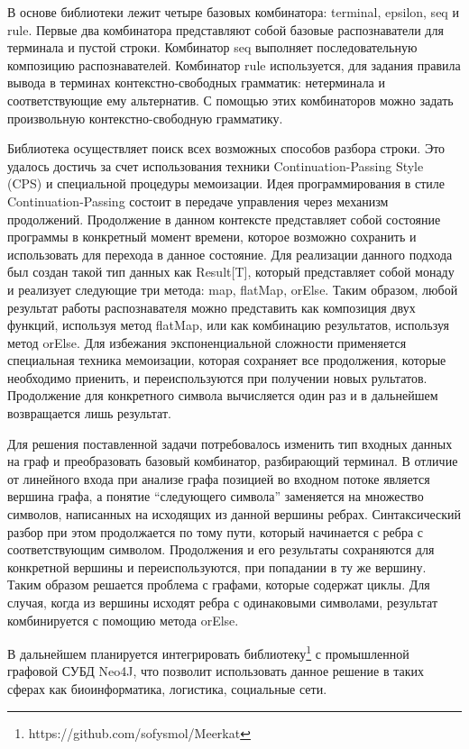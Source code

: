\documentclass [a4paper] {article}
\begin{document}
В основе библиотеки лежит четыре базовых комбинатора: terminal, epsilon, seq и rule. Первые два комбинатора представляют собой базовые распознаватели для терминала и пустой строки. Комбинатор seq выполняет последовательную композицию распознавателей. Комбинатор rule используется, для задания правила вывода в терминах контекстно-свободных грамматик: нетерминала и соответствующие ему альтернатив. С помощью этих комбинаторов можно задать произвольную контекстно-свободную грамматику. 


Библиотека осуществляет поиск всех возможных способов разбора строки. Это удалось достичь за счет использования техники Continuation-Passing Style (CPS) и специальной процедуры мемоизации. Идея программирования в стиле Continuation-Passing состоит в передаче управления через механизм продолжений. Продолжение в данном контексте представляет собой состояние программы в конкретный момент времени, которое возможно сохранить и использовать для перехода в данное состояние. Для реализации данного подхода был создан такой тип данных как Result[T],  который представляет собой монаду и реализует следующие три метода: map, flatMap, orElse. Таким образом, любой результат работы распознавателя можно представить как композиция двух функций, используя метод flatMap, или как комбинацию результатов, используя метод orElse. Для избежания экспоненциальной сложности применяется специальная техника мемоизации, которая сохраняет все продолжения, которые необходимо приенить, и переиспользуются при получении новых рультатов. Продолжение для конкретного символа вычисляется один раз и в дальнейшем возвращается лишь результат. 


Для решения поставленной задачи потребовалось изменить тип входных данных на граф и преобразовать базовый комбинатор, разбирающий терминал. В отличие от линейного входа при анализе графа позицией во входном потоке является вершина графа, а понятие “следующего символа” заменяется на множество символов, написанных на исходящих из данной вершины ребрах. Синтаксический разбор при этом продолжается по тому пути, который начинается с ребра с соответствующим символом. Продолжения и его результаты сохраняются для конкретной вершины и переиспользуются, при попадании в ту же вершину. Таким образом решается проблема с графами, которые содержат циклы.  Для случая, когда из вершины исходят ребра с одинаковыми символами, результат комбинируется с помощию метода orElse. 


В дальнейшем планируется интегрировать библиотеку\footnote{https://github.com/sofysmol/Meerkat} с промышленной графовой СУБД Neo4J, что позволит использовать данное решение в таких сферах как биоинформатика,  логистика, социальные сети.

\printbibliography

\end{document}
